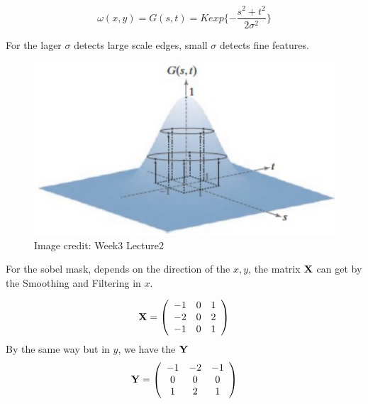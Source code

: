 \documentclass[final]{cvpr}
\begin{document}
\begin{equation}
   \omega (x,y) = G(s,t)=K exp\{-\frac{s^2+t^2}{2 \sigma^2}\} \label{eq: gaussian kernel}
\end{equation} 

For the lager $\sigma$ detects large scale edges, small $\sigma$ detects fine features.

\begin{figure}[htbp]
\centering

\includegraphics[width=0.7\linewidth]{1.png}

\caption{Image credit: Week3 Lecture2}
\label{fig: gaussian kernel}
\end{figure}

For the sobel mask, depends on the direction of the $x,y$, the matrix $\bf{X}$ can get by the Smoothing and Filtering in $x$.

\begin{equation*}
      \bf{X}=\left(         
  \begin{array}{ccc}  
    -1 & 0 & 1\\  
    -2 & 0 & 2\\  
    -1 & 0 & 1 \\
  \end{array}
\right)  
\end{equation*}
By the same way but in $y$, we have the $\bf{Y}$
\begin{equation*}
      \bf{Y}=\left(         
  \begin{array}{ccc}  
    -1 & -2 & -1\\  
    0 & 0 & 0\\  
    1 & 2 & 1 \\
  \end{array}
\right)  
\end{equation*}



\end{document}
